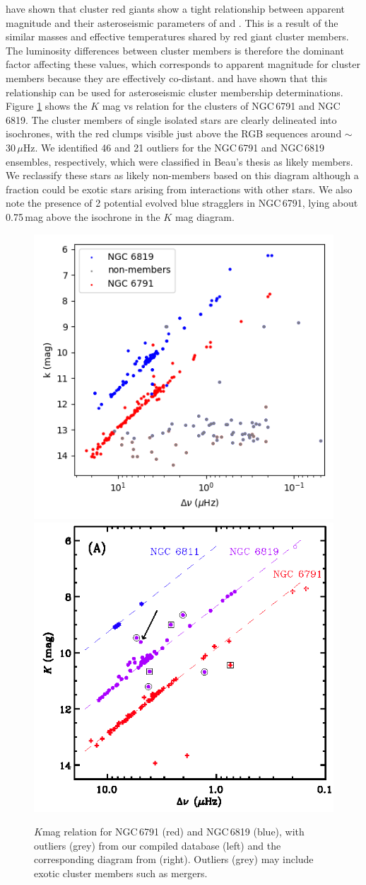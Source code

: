 \cite{stello_asteroseismic_2011} have shown that cluster red giants show a tight relationship between apparent magnitude and their asteroseismic parameters of \numax{} and \dnu{}. This is a result of the similar masses and effective temperatures shared by red giant cluster members. The luminosity differences between cluster members is therefore the dominant factor affecting these values, which corresponds to apparent magnitude for cluster members because they are effectively co-distant. \cite{stello_detection_2010} and \cite{bellamy_new_2015} have shown that this relationship can be used for asteroseismic cluster membership determinations. Figure \ref{fig:magdnu} shows the $K$ mag vs \dnu{} relation for the clusters of NGC\,6791 and NGC\,6819. The cluster members of single isolated stars are clearly delineated into isochrones, with the red clumps visible just above the RGB sequences around \numax{}$\sim$30\,$\mu$Hz. We identified 46 and 21 outliers for the NGC\,6791 and NGC\,6819 ensembles, respectively, which were classified in Beau's thesis as likely members. We reclassify these stars as likely non-members based on this diagram although a fraction could be exotic stars arising from interactions with other stars. We also note the presence of 2 potential evolved blue stragglers in NGC\,6791, lying about 0.75\,mag above the isochrone in the $K$ mag \textendash \dnu{} diagram.

\begin{figure}
    \centering
    \includegraphics[width=0.5\linewidth]{Chapter5/kmag_dnu.png}
    \includegraphics[width=0.48\linewidth]{Chapter5/stello_11_kmagdnu.png}
    \caption[$K$mag \textendash \dnu{} relation for NGC\,6791 and NGC\,6819]{$K$mag \textendash \dnu{} relation for NGC\,6791 (red) and NGC\,6819 (blue), with outliers (grey) from our compiled database (left) and the corresponding diagram from \citep{stello_asteroseismic_2011} (right). Outliers (grey) may include exotic cluster members such as mergers.}
    \label{fig:magdnu}
\end{figure}

